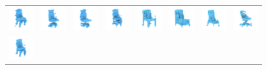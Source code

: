 \begin{figure}[t]
\setlength{\tabcolsep}{0pt}
\centering
\begin{tabular}{cccc|cccc}
\includegraphics[width=.12\linewidth]{prgan/fig/comparison/3dgan8.png} &
\includegraphics[width=.12\linewidth]{prgan/fig/comparison/3dgan9.png} &
\includegraphics[width=.12\linewidth]{prgan/fig/comparison/3dgan10.png} &
\includegraphics[width=.12\linewidth]{prgan/fig/comparison/3dgan11.png} &
\includegraphics[width=.12\linewidth]{prgan/fig/comparison/prgan0.png} &
\includegraphics[width=.12\linewidth]{prgan/fig/comparison/prgan1.png} &
\includegraphics[width=.12\linewidth]{prgan/fig/comparison/prgan2.png} &
\includegraphics[width=.12\linewidth]{prgan/fig/comparison/prgan3.png} \\
\includegraphics[width=.12\linewidth]{prgan/fig/comparison/3dgan12.png} &

\end{tabular}
\end{figure}

